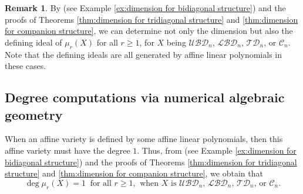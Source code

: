 \documentclass[reqno]{amsart}
\theoremstyle{definition}
\newtheorem{remark}[theorem]{Remark}
\numberwithin{equation}{section}
\begin{document}
\begin{remark}
    By \cite[Lemma 5.1]{ye2017new} (see Example \ref{ex:dimension for bidiagonal structure}) and the proofs of Theorems \ref{thm:dimension for tridiagonal structure} and \ref{thm:dimension for companion structure}, we can determine not only the dimension but also the defining ideal of $\mu_r(X)$ for all $r \geq 1$, for $X$ being $\mathcal{UBD}_n$, $\mathcal{LBD}_n$, $\mathcal{TD}_n$, or $\mathcal{C}_n$. Note that the defining ideals are all generated by affine linear polynomials in these cases.
\end{remark}

\subsection{Degree computations via numerical algebraic geometry}\label{subsection:Degree}

When an affine variety is defined by some affine linear polynomials, then this affine variety must have the degree $1$. Thus, from \cite[Lemma 5.1]{ye2017new} (see Example \ref{ex:dimension for bidiagonal structure}) and the proofs of Theorems \ref{thm:dimension for tridiagonal structure} and \ref{thm:dimension for companion structure}, we obtain that 
\begin{equation*}
    \deg \mu_r(X)=1~\text{ for all $r \geq 1$,}~\text{ when $X$ is $\mathcal{UBD}_n$, $\mathcal{LBD}_n$, $\mathcal{TD}_n$, or $\mathcal{C}_n$}.
\end{equation*}
\end{document}
